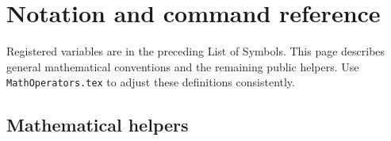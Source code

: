 
\chapter*{Notation and command reference}
Registered variables are in the preceding List of Symbols. This page describes
general mathematical conventions and the remaining public helpers. Use
\texttt{MathOperators.tex} to adjust these definitions consistently.

\section*{Mathematical helpers}
